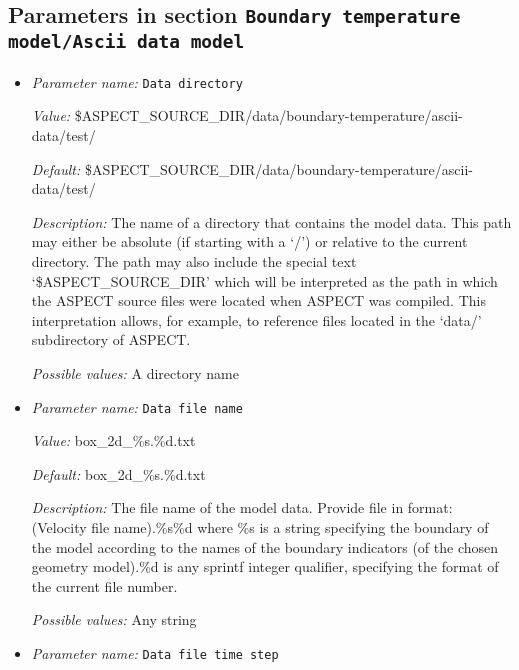 \subsection{Parameters in section \tt Boundary temperature model/Ascii data model}
\label{parameters:Boundary_20temperature_20model/Ascii_20data_20model}

\begin{itemize}
\item {\it Parameter name:} {\tt Data directory}
\label{parameters:Boundary temperature model/Ascii data model/Data directory}


{\it Value:} \$ASPECT\_SOURCE\_DIR/data/boundary-temperature/ascii-data/test/


{\it Default:} \$ASPECT\_SOURCE\_DIR/data/boundary-temperature/ascii-data/test/


{\it Description:} The name of a directory that contains the model data. This path may either be absolute (if starting with a `/') or relative to the current directory. The path may also include the special text `\$ASPECT\_SOURCE\_DIR' which will be interpreted as the path in which the ASPECT source files were located when ASPECT was compiled. This interpretation allows, for example, to reference files located in the `data/' subdirectory of ASPECT. 


{\it Possible values:} A directory name
\item {\it Parameter name:} {\tt Data file name}
\label{parameters:Boundary temperature model/Ascii data model/Data file name}


{\it Value:} box\_2d\_\%s.\%d.txt


{\it Default:} box\_2d\_\%s.\%d.txt


{\it Description:} The file name of the model data. Provide file in format: (Velocity file name).\%s\%d where \%s is a string specifying the boundary of the model according to the names of the boundary indicators (of the chosen geometry model).\%d is any sprintf integer qualifier, specifying the format of the current file number. 


{\it Possible values:} Any string
\item {\it Parameter name:} {\tt Data file time step}
\label{parameters:Boundary temperature model/Ascii data model/Data file time step}



\end{itemize}
